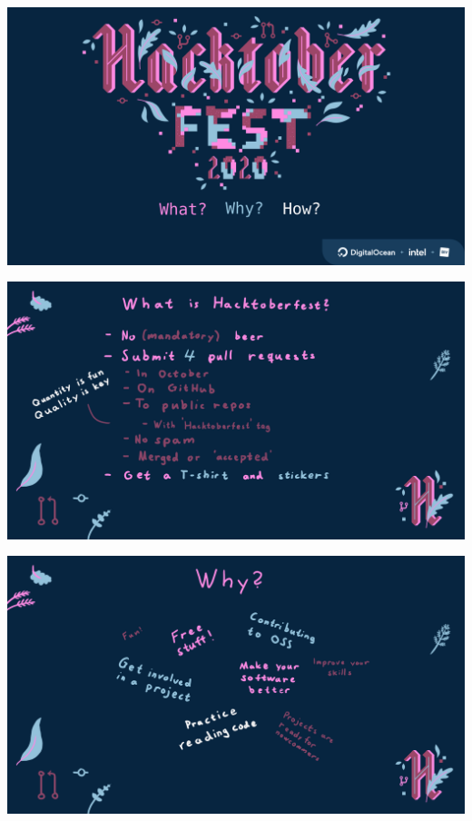 \documentclass[aspectratio=169]{beamer}
\begin{document}
\begin{frame}[plain]
    \includegraphics[width=\textwidth]{slide1.png}
\end{frame}
\begin{frame}[plain]
    \includegraphics[width=\textwidth]{slide2.png}
\end{frame}
\begin{frame}[plain]
    \includegraphics[width=\textwidth]{slide3.png}
\end{frame}
\end{document}
